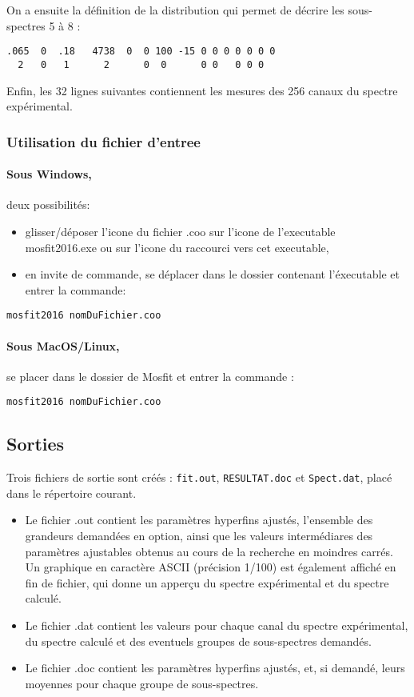On a ensuite la définition de la distribution qui permet de décrire les sous-spectres 5 à 8 :
\begin{lstlisting}[frame=single]
.065  0  .18   4738  0  0 100 -15 0 0 0 0 0 0 0
  2   0   1      2      0  0      0 0   0 0 0
\end{lstlisting}
Enfin, les 32 lignes suivantes contiennent les mesures des 256 canaux du spectre expérimental.
\FloatBarrier


\subsubsection{Utilisation du fichier d'entree}
\paragraph{Sous Windows,} deux possibilités:
\begin{itemize}
\item glisser/déposer l'icone du fichier .coo sur l'icone de l'executable mosfit2016.exe ou sur l'icone du raccourci vers cet executable, 
\item en invite de commande, se déplacer dans le dossier contenant l'éxecutable et entrer la commande: 
\end{itemize}

\begin{lstlisting}[frame=single]
mosfit2016 nomDuFichier.coo
\end{lstlisting}

\paragraph{Sous MacOS/Linux, } se placer dans le dossier de Mosfit et entrer la commande : 

\begin{lstlisting}[frame=single]
mosfit2016 nomDuFichier.coo
\end{lstlisting}
\FloatBarrier
\subsection{Sorties}
Trois fichiers de sortie sont créés :  \lstinline{fit.out}, \lstinline{RESULTAT.doc} et \lstinline{Spect.dat}, placé dans le répertoire courant.
\begin{itemize}
\item Le fichier .out contient les paramètres hyperfins ajustés, l'ensemble des grandeurs demandées en option, ainsi que les valeurs intermédiares des paramètres ajustables obtenus au cours de la recherche en moindres carrés.
     Un graphique en caractère ASCII (précision 1/100) est également affiché en fin de fichier, qui donne un apperçu du spectre expérimental et du spectre calculé.
\item Le fichier .dat contient les valeurs pour chaque canal du spectre expérimental, du spectre calculé et des eventuels groupes de sous-spectres demandés.
\item Le fichier .doc contient les paramètres hyperfins ajustés, et, si demandé, leurs moyennes pour chaque groupe de sous-spectres. 
\end{itemize}

